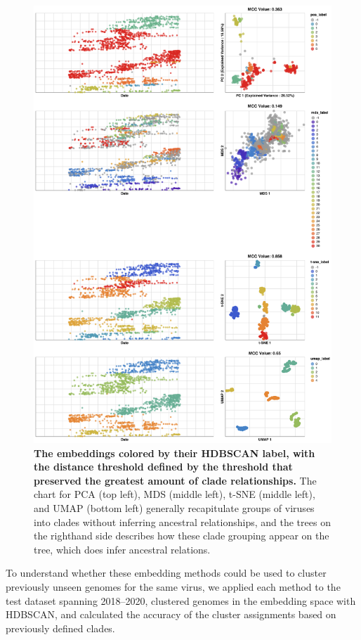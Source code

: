 \documentclass[10pt,letterpaper]{article}
\begin{document}
\begin{figure}[!h]
\includegraphics[width=\columnwidth]{figures/flu-2016-2018-ha-embeddings-by-cluster.png}
\caption{{\bf The embeddings colored by their HDBSCAN label, with the distance threshold defined by the threshold that preserved the greatest amount of clade relationships.}
The chart for PCA (top left), MDS (middle left), t-SNE (middle left), and UMAP (bottom left) generally recapitulate groups of viruses into clades without inferring ancestral relationships, and the trees on the righthand side describes how these clade grouping appear on the tree, which does infer ancestral relations.}
\label{fig:seasonal-influenza-h3n2-ha-clusters}
\end{figure}

To understand whether these embedding methods could be used to cluster previously unseen genomes for the same virus, we applied each method to the test dataset spanning 2018--2020, clustered genomes in the embedding space with HDBSCAN, and calculated the accuracy of the cluster assignments based on previously defined clades.
\end{document}

